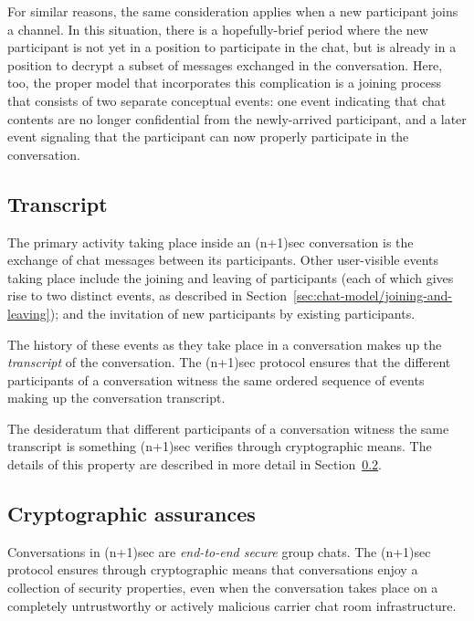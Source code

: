 \documentclass{article}
\begin{document}
For similar reasons, the same consideration applies when a new participant joins a channel.
In this situation, there is a hopefully-brief period where the new participant is not yet in a position to participate in the chat, but is already in a position to decrypt a subset of messages exchanged in the conversation.
Here, too, the proper model that incorporates this complication is a joining process that consists of two separate conceptual events: one event indicating that chat contents are no longer confidential from the newly-arrived participant, and a later event signaling that the participant can now properly participate in the conversation.


\subsection{Transcript}
\label{sec:chat-model/transcript}

The primary activity taking place inside an (n+1)sec conversation is the exchange of chat messages between its participants.
Other user-visible events taking place include the joining and leaving of participants (each of which gives rise to two distinct events, as described in Section~\ref{sec:chat-model/joining-and-leaving}); and the invitation of new participants by existing participants.

The history of these events as they take place in a conversation makes up the \emph{transcript} of the conversation.
The (n+1)sec protocol ensures that the different participants of a conversation witness the same ordered sequence of events making up the conversation transcript.

The desideratum that different participants of a conversation witness the same transcript is something (n+1)sec verifies through cryptographic means.
The details of this property are described in more detail in Section~\ref{sec:chat-model/cryptographic-assurances}.


\subsection{Cryptographic assurances}
\label{sec:chat-model/cryptographic-assurances}

Conversations in (n+1)sec are \emph{end-to-end secure} group chats.
The (n+1)sec protocol ensures through cryptographic means that conversations enjoy a collection of security properties, even when the conversation takes place on a completely untrustworthy or actively malicious carrier chat room infrastructure.
\end{document}
